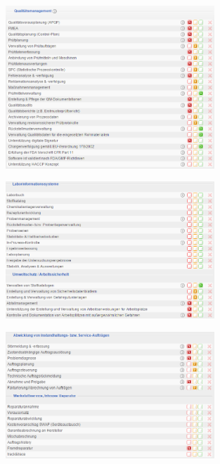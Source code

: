 \documentclass[12pt]{article}
\begin{document}
\noindent
\begin{figure}[!h]
\centering
\includegraphics[width=0.7\textwidth]{images/tr27}
\end{figure}\FloatBarrier
\noindent
\begin{figure}[!h]
\centering
\includegraphics[width=0.7\textwidth]{images/tr28}
\end{figure}\FloatBarrier
\noindent
\begin{figure}[!h]
\centering
\includegraphics[width=0.7\textwidth]{images/tr29}
\end{figure}\FloatBarrier
\noindent
\end{document}
